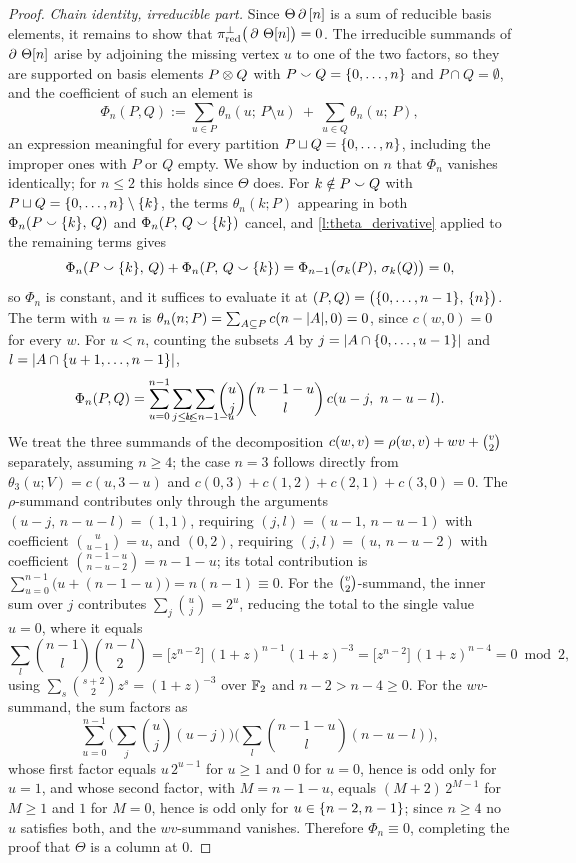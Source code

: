 \documentclass{amsart}
\begin{document}
\begin{proof}
	\medskip
	\textit{Chain identity, irreducible part.}
	Since $\Theta\operatorname{\partial}\,[n]$ is a sum of reducible basis elements, it remains to show that $\pi^\perp_{\text{red}}\big(\operatorname{\partial}\,\Theta[n]\big) = 0$.
	The irreducible summands of $\operatorname{\partial}\, \Theta[n]$ arise by adjoining the missing vertex $u$ to one of the two factors, so they are supported on basis elements $P \otimes Q$ with $P \union Q = \set{0, \dots, n}$ and $P \cap Q = \emptyset$, and the coefficient of such an element is
	\[
	\Phi_n(P, Q) :=
	\sum_{u \in P} \theta_n(u;\, P \setminus u) \ + \
	\sum_{u \in Q} \theta_n(u;\, P),
	\]
	an expression meaningful for every partition $P \sqcup Q = \{0,\dots,n\}$, including the improper ones with $P$ or $Q$ empty.
	We show by induction on $n$ that $\Phi_n$ vanishes identically; for $n \leq 2$ this holds since $\Theta$ does.
	For $k \notin P \union Q$ with $P \sqcup Q = \{0,\dots,n\} \setminus \{k\}$, the terms $\theta_n(k; P)$ appearing in both $\Phi_n(P \union \set{k},\, Q)$ and $\Phi_n(P,\, Q \union \set{k})$ cancel, and \cref{l:theta_derivative} applied to the remaining terms gives
	\[
	\Phi_n(P \union \set{k},\, Q) + \Phi_n(P,\, Q \union \set{k}) =
	\Phi_{n-1}\big(\sigma_k(P),\, \sigma_k(Q)\big) = 0,
	\]
	so $\Phi_n$ is constant, and it suffices to evaluate it at $(P, Q) = \big(\{0, \dots, n-1\},\, \{n\}\big)$.
	The term with $u = n$ is $\theta_n(n; P) = \sum_{A \subseteq P} c(n - \lvert A\rvert, 0) = 0$, since $c(w, 0) = 0$ for every $w$.
	For $u < n$, counting the subsets $A$ by $j = \lvert A \cap \{0,\dots,u-1\}\rvert$ and $l = \lvert A \cap \{u+1, \dots, n-1\}\rvert$,
	\[
	\Phi_n(P,Q) = \sum_{u=0}^{n-1} \sum_{j \leq u} \sum_{\ \ \mathclap{l \leq n-1-u}} \binom{u}{j} \binom{n-1-u}{l}\, c(u - j,\ n - u - l).
	\]
	We treat the three summands of the decomposition $c(w,v) = \rho(w,v) + wv + \tbinom{v}{2}$ separately, assuming $n \geq 4$; the case $n = 3$ follows directly from $\theta_3(u;V) = c(u, 3-u)$ and $c(0,3) + c(1,2) + c(2,1) + c(3,0) = 0$.
	The $\rho$-summand contributes only through the arguments $(u-j,\, n-u-l) = (1,1)$, requiring $(j, l) = (u-1,\, n-u-1)$ with coefficient $\binom{u}{u-1} = u$, and $(0,2)$, requiring $(j,l) = (u,\, n-u-2)$ with coefficient $\binom{n-1-u}{n-u-2} = n-1-u$; its total contribution is $\sum_{u=0}^{n-1} \big(u + (n - 1 - u)\big) = n(n-1) \equiv 0$.
	For the $\tbinom{v}{2}$-summand, the inner sum over $j$ contributes $\sum_j \binom{u}{j} = 2^u$, reducing the total to the single value $u = 0$, where it equals
	\[
	\sum_{l} \binom{n-1}{l}\binom{n-l}{2} =
	\big[z^{n-2}\big]\, (1+z)^{n-1} (1+z)^{-3} =
	\big[z^{n-2}\big]\, (1+z)^{n-4} = 0 \bmod 2,
	\]
	using $\sum_{s} \binom{s+2}{2} z^s = (1+z)^{-3}$ over ${\mathbb{F}_2}$ and $n - 2 > n - 4 \geq 0$.
	For the $wv$-summand, the sum factors as
	\[
	\sum_{u=0}^{n-1} \Big(\sum_{j} \binom{u}{j}(u-j)\Big) \Big(\sum_{l} \binom{n-1-u}{l}(n-u-l)\Big),
	\]
	whose first factor equals $u\, 2^{u-1}$ for $u \geq 1$ and $0$ for $u = 0$, hence is odd only for $u = 1$, and whose second factor, with $M = n - 1 - u$, equals $(M+2)\,2^{M-1}$ for $M \geq 1$ and $1$ for $M = 0$, hence is odd only for $u \in \{n-2, n-1\}$; since $n \geq 4$ no $u$ satisfies both, and the $wv$-summand vanishes.
	Therefore $\Phi_n \equiv 0$, completing the proof that $\Theta$ is a column at $0$.


\end{proof}
\end{document}
